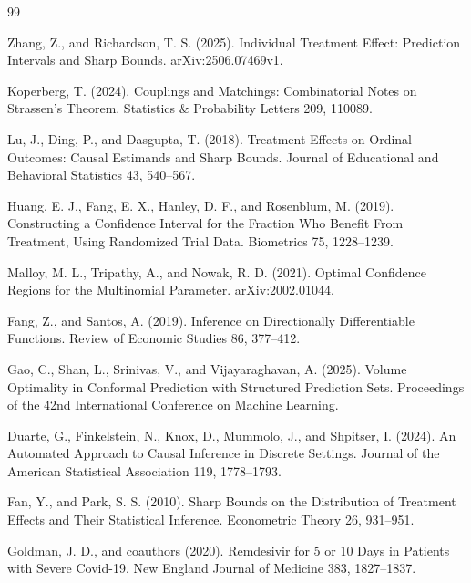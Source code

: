 \documentclass{article}
\begin{document}
\begin{thebibliography}{99}

   Zhang, Z., and Richardson, T. S. (2025). Individual Treatment Effect: Prediction Intervals and Sharp Bounds. arXiv:2506.07469v1.

   Koperberg, T. (2024). Couplings and Matchings: Combinatorial Notes on Strassen's Theorem. Statistics \& Probability Letters 209, 110089.

   Lu, J., Ding, P., and Dasgupta, T. (2018). Treatment Effects on Ordinal Outcomes: Causal Estimands and Sharp Bounds. Journal of Educational and Behavioral Statistics 43, 540--567.

   Huang, E. J., Fang, E. X., Hanley, D. F., and Rosenblum, M. (2019). Constructing a Confidence Interval for the Fraction Who Benefit From Treatment, Using Randomized Trial Data. Biometrics 75, 1228--1239.

   Malloy, M. L., Tripathy, A., and Nowak, R. D. (2021). Optimal Confidence Regions for the Multinomial Parameter. arXiv:2002.01044.

   Fang, Z., and Santos, A. (2019). Inference on Directionally Differentiable Functions. Review of Economic Studies 86, 377--412.

   Gao, C., Shan, L., Srinivas, V., and Vijayaraghavan, A. (2025). Volume Optimality in Conformal Prediction with Structured Prediction Sets. Proceedings of the 42nd International Conference on Machine Learning.

   Duarte, G., Finkelstein, N., Knox, D., Mummolo, J., and Shpitser, I. (2024). An Automated Approach to Causal Inference in Discrete Settings. Journal of the American Statistical Association 119, 1778--1793.

   Fan, Y., and Park, S. S. (2010). Sharp Bounds on the Distribution of Treatment Effects and Their Statistical Inference. Econometric Theory 26, 931--951.

   Goldman, J. D., and coauthors (2020). Remdesivir for 5 or 10 Days in Patients with Severe Covid-19. New England Journal of Medicine 383, 1827--1837.

\end{thebibliography}
\end{document}
